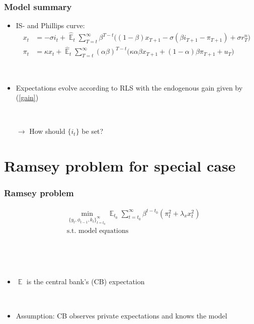 \documentclass[11pt]{beamer}
\DeclareMathOperator{\E}{\mathbb{E}}
\begin{document}
\begin{frame}
	\frametitle{Model summary}
	\label{aggregate_LOMS}
\begin{itemize}
\item IS- and Phillips curve:	
 \begin{align}
x_t &=  -\sigma i_t +\hat{\E}_t \sum_{T=t}^{\infty} \beta^{T-t }\big( (1-\beta)x_{T+1} - \sigma(\beta i_{T+1} - \pi_{T+1}) +\sigma r_T^n \big)  \label{NKIS}  \\
\pi_t &= \kappa x_t +\hat{\E}_t \sum_{T=t}^{\infty} (\alpha\beta)^{T-t }\big( \kappa \alpha \beta x_{T+1} + (1-\alpha)\beta \pi_{T+1} + u_T\big) \label{NKPC} 
\end{align}
\hfill \hyperlink{derivations}{}

\

\item  Expectations evolve according to RLS with the endogenous gain given by (\ref{gain})

\

\item[$\rightarrow$] How should $\{ i_t \}$ be set?
\end{itemize}



\end{frame}


\section{Ramsey problem for special case}

\begin{frame}
	\frametitle{Ramsey problem}
	 \begin{align*}
& \min_{ \{y_t, \phi_{t-1}, k_t \}_{t=t_0}^{\infty}} \E_{t_0}\sum_{t=t_0}^{\infty} \beta^{t-t_0} (\pi_t^2  + \lambda_x x_t^2 )  \\
& \text{s.t. model equations}
\end{align*}

\

\

\begin{itemize}
\item $\E$ is the central bank's (CB) expectation

\

\item Assumption: CB observes private expectations and knows the model
\end{itemize}

 

\end{frame}
\end{document}
